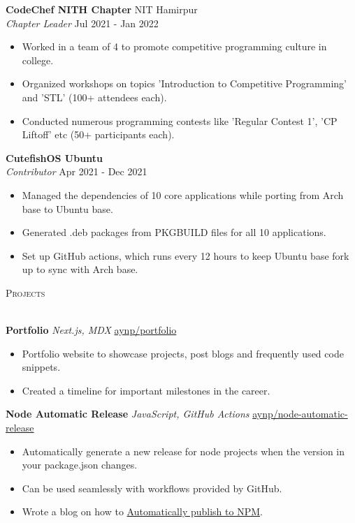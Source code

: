 \documentclass[a4paper]{article}
\newcommand{\lineunder} {
    \vspace*{-8pt} \\
    \hspace*{-18pt} \hrulefill \\
}
\newcommand{\header} [1] {
    {\hspace*{-18pt}\vspace*{6pt} \textsc{#1}}
    \vspace*{-6pt} \lineunder
}
\begin{document}
\textbf{CodeChef NITH Chapter} \hfill NIT Hamirpur\\
\textit{Chapter Leader} \hfill Jul 2021 - Jan 2022\\
\begin{itemize}
    \item Worked in a team of 4 to promote competitive programming culture in college.
	\item Organized workshops on topics 'Introduction to Competitive Programming' and 'STL' (100+ attendees each).
	\item Conducted numerous programming contests like 'Regular Contest 1', 'CP Liftoff' etc (50+ participants each).
\end{itemize}
\vspace{1.5mm}

\textbf{CutefishOS Ubuntu}\\
\textit{Contributor} \hfill Apr 2021 - Dec 2021\\
\begin{itemize}
	\item Managed the dependencies of 10 core applications while porting from Arch base to Ubuntu base.
	\item Generated .deb packages from PKGBUILD files for all 10 applications.
	\item Set up GitHub actions, which runs every 12 hours to keep Ubuntu base fork up to sync with Arch base.
\end{itemize}
\vspace{1.5mm}


\header{Projects}
\vspace{1mm}

{\textbf{Portfolio}} {\sl Next.js, MDX} \hfill \href{https://github.com/aynp/portfolio}{aynp/portfolio}\\
\begin{itemize}
	\item Portfolio website to showcase projects, post blogs and frequently used code snippets.
	\item Created a timeline for important milestones in the career.
\end{itemize}
\vspace*{1.5mm}

{\textbf{Node Automatic Release}} {\sl JavaScript, GitHub Actions} \hfill \href{https://github.com/aynp/node-automatic-release}{aynp/node-automatic-release}\\
\begin{itemize}
	\item Automatically generate a new release for node projects when the version in your package.json changes.
	\item Can be used seamlessly with workflows provided by GitHub.
	\item Wrote a blog on how to \href{https://aryanpathania.vercel.app/blog/automatic-npm-publish}{Automatically publish to NPM}.
\end{itemize}
\vspace*{1.5mm}
\end{document}
